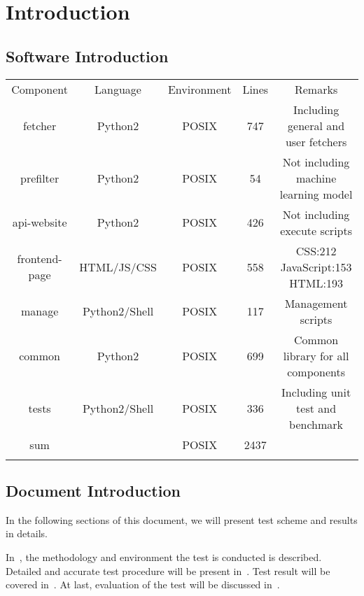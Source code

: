 
\section{Introduction}
\label{sec:intro}
\subsection{Software Introduction}
\begin{center}
\begin{table}[!ht]
	\begin{tabular}{|c|c|c|c|c|}
		\shline
		Component     & Language          & Environment & Lines & Remarks                            \\ \shline
		fetcher       & Python2           & POSIX       & 747   & Including general and user fetchers \\ \hline
		prefilter     & Python2           & POSIX       & 54    & Not including machine learning model   \\ \hline
		api-website   & Python2           & POSIX       & 426   & Not including execute scripts     \\ \hline
		frontend-page & HTML/JS/CSS       & POSIX       & 558   & CSS:212 JavaScript:153 HTML:193   \\ \hline
		manage        & Python2/Shell     & POSIX       & 117   & Management scripts                \\ \hline
		common        & Python2           & POSIX       & 699   & Common library for all components \\ \hline
		tests         & Python2/Shell     & POSIX       & 336   & Including unit test and benchmark \\ \hline
		sum           &                   & POSIX       & 2437  &                                   \\ \shline
	\end{tabular}
\end{table}
\end{center}

\subsection{Document Introduction}
\label{sec:introduction}
	In the following sections of this document, we will present test scheme and
	results in details.

	In~, the methodology and environment the test is conducted
	is described. Detailed and accurate test procedure will be present in~.
	Test result will be covered in~. At last, evaluation of the test
	will be discussed in~.

